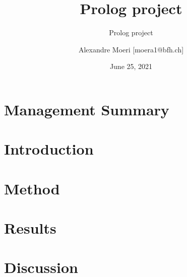 \documentclass[
  12pt, %
  a4paper, %
  oneside,
  numbers=noenddot, %
  BCOR=5mm, %
  parskip=half*, %
  thesis
]{bfhbook}
\author{Alexandre Moeri [moera1@bfh.ch]}
\title{Prolog project}
\subtitle{Prolog project}
\date{June 25, 2021} %
\begin{document}
\maketitle
\frontmatter %
\allowdisplaybreaks

\chapter*{Management Summary}


\tableofcontents
\sloppy
\mainmatter %

\chapter{Introduction}

\chapter{Method}

\chapter{Results}

\chapter{Discussion}


\backmatter
\listoffigures
\listoftables
\printbibliography
\end{document}
